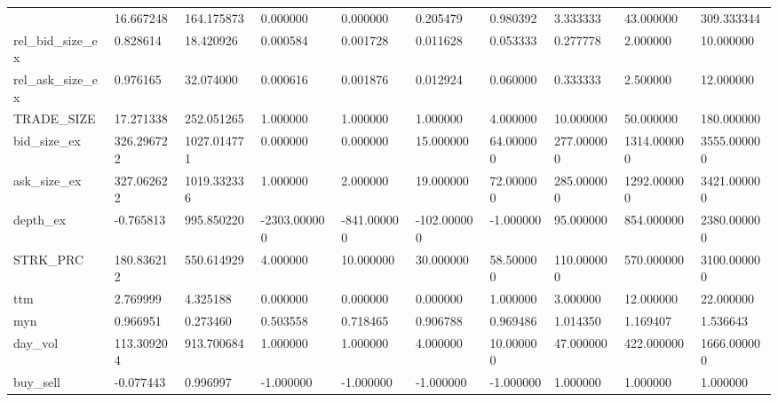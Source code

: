 \begin{table}
\begin{tabular}{llllllllll}
{bid_ask_size_ratio_ex & 16.667248 & 164.175873 & 0.000000 & 0.000000 & 0.205479 & 0.980392 & 3.333333 & 43.000000 & 309.333344 \\
rel_bid_size_ex & 0.828614 & 18.420926 & 0.000584 & 0.001728 & 0.011628 & 0.053333 & 0.277778 & 2.000000 & 10.000000 \\
rel_ask_size_ex & 0.976165 & 32.074000 & 0.000616 & 0.001876 & 0.012924 & 0.060000 & 0.333333 & 2.500000 & 12.000000 \\
TRADE_SIZE & 17.271338 & 252.051265 & 1.000000 & 1.000000 & 1.000000 & 4.000000 & 10.000000 & 50.000000 & 180.000000 \\
bid_size_ex & 326.296722 & 1027.014771 & 0.000000 & 0.000000 & 15.000000 & 64.000000 & 277.000000 & 1314.000000 & 3555.000000 \\
ask_size_ex & 327.062622 & 1019.332336 & 1.000000 & 2.000000 & 19.000000 & 72.000000 & 285.000000 & 1292.000000 & 3421.000000 \\
depth_ex & -0.765813 & 995.850220 & -2303.000000 & -841.000000 & -102.000000 & -1.000000 & 95.000000 & 854.000000 & 2380.000000 \\
STRK_PRC & 180.836212 & 550.614929 & 4.000000 & 10.000000 & 30.000000 & 58.500000 & 110.000000 & 570.000000 & 3100.000000 \\
ttm & 2.769999 & 4.325188 & 0.000000 & 0.000000 & 0.000000 & 1.000000 & 3.000000 & 12.000000 & 22.000000 \\
myn & 0.966951 & 0.273460 & 0.503558 & 0.718465 & 0.906788 & 0.969486 & 1.014350 & 1.169407 & 1.536643 \\
day_vol & 113.309204 & 913.700684 & 1.000000 & 1.000000 & 4.000000 & 10.000000 & 47.000000 & 422.000000 & 1666.000000 \\
buy_sell & -0.077443 & 0.996997 & -1.000000 & -1.000000 & -1.000000 & -1.000000 & 1.000000 & 1.000000 & 1.000000 \\
\bottomrule
\end{tabular}
\end{table}
